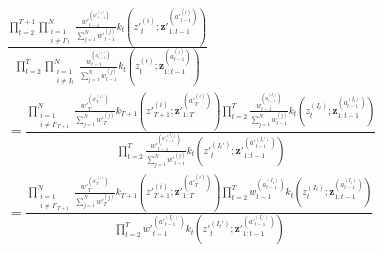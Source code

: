 \documentclass[11pt]{article}
\newcommand{\z}{\mathbf{z}}
\begin{document}
\begin{align*}
&\frac{
\prod_{t=2}^{T+1} \prod_{\substack{i=1\\i \ne I'_t}}^N \frac{{w'}_{t-1}^{({a'}_{t-1}^{(i)})}}{\sum_{j=1}^N {w'}_{t-1}^{(j)}} k_t({z'}_t^{(i)}; {\z'}_{1:t-1}^{({a'}_{t-1}^{(i)})} )
}{
\prod_{t=2}^T \prod_{\substack{i=1\\i \ne I_t}}^N \frac{w_{t-1}^{(a_{t-1}^{(i)})}}{\sum_{j=1}^N w_{t-1}^{(j)}} k_t(z_t^{(i)}; \z_{1:t-1}^{(a_{t-1}^{(i)})} )
}\\ &=
\frac{
\displaystyle \prod_{\substack{i=1\\i \ne I'_{T+1}}}^N \frac{{w'}_{T}^{({a'}_{T}^{(i)})}}{\sum_{j=1}^N {w'}_{T}^{(j)}} k_{T+1}({z'}_{T+1}^{(i)}; {\z'}_{1:T}^{({a'}_{T}^{(i)})} )
\prod_{t=2}^{T} \frac{{w}_{t-1}^{({a}_{t-1}^{(I_t)})}}{\sum_{j=1}^N {w}_{t-1}^{(j)}} k_t({z}_t^{(I_t)}; {\z}_{1:t-1}^{({a}_{t-1}^{(I_t)})} )
}{
\displaystyle \prod_{t=2}^{T} \frac{{w'}_{t-1}^{({a'}_{t-1}^{(I_t')})}}{\sum_{j=1}^N {w'}_{t-1}^{(j)}} k_t({z'}_t^{(I_t')}; {\z'}_{1:t-1}^{({a'}_{t-1}^{(I_t')})} )
}\\ &=
\frac{
\displaystyle \prod_{\substack{i=1\\i \ne I'_{T+1}}}^N \frac{{w'}_{T}^{({a'}_{T}^{(i)})}}{\sum_{j=1}^N {w'}_{T}^{(j)}} k_{T+1}({z'}_{T+1}^{(i)}; {\z'}_{1:T}^{({a'}_{T}^{(i)})} )
\prod_{t=2}^{T} {w}_{t-1}^{({a}_{t-1}^{(I_t)})} k_t({z}_t^{(I_t)}; {\z}_{1:t-1}^{({a}_{t-1}^{(I_t)})} )
}{
\displaystyle \prod_{t=2}^{T} {w'}_{t-1}^{({a'}_{t-1}^{(I_t')})} k_t({z'}_t^{(I_t')}; {\z'}_{1:t-1}^{({a'}_{t-1}^{(I_t')})} )
}
\end{align*}
\end{document}
